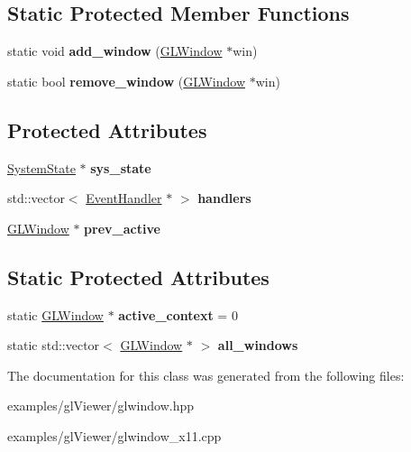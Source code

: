 \subsection*{Static Protected Member Functions}
\begin{DoxyCompactItemize}
\item 
\mbox{\label{classglwindow_1_1_g_l_window_a6ec4437b302fad937613bbc7305b54af}} 
static void {\bfseries add\+\_\+window} (\hyperlink{classglwindow_1_1_g_l_window}{G\+L\+Window} $\ast$win)
\item 
\mbox{\label{classglwindow_1_1_g_l_window_a20ba7d81fc374904b55ec40e3fb19a52}} 
static bool {\bfseries remove\+\_\+window} (\hyperlink{classglwindow_1_1_g_l_window}{G\+L\+Window} $\ast$win)
\end{DoxyCompactItemize}
\subsection*{Protected Attributes}
\begin{DoxyCompactItemize}
\item 
\mbox{\label{classglwindow_1_1_g_l_window_a362305bae97dad5418748841d7691694}} 
\hyperlink{struct_g_l_window_1_1_system_state}{System\+State} $\ast$ {\bfseries sys\+\_\+state}
\item 
\mbox{\label{classglwindow_1_1_g_l_window_a63eb370b84f35a788b4831e7e8ebb883}} 
std\+::vector$<$ \hyperlink{structglwindow_1_1_event_handler}{Event\+Handler} $\ast$ $>$ {\bfseries handlers}
\item 
\mbox{\label{classglwindow_1_1_g_l_window_a1b26b56139bda79015c4acd5082af29b}} 
\hyperlink{classglwindow_1_1_g_l_window}{G\+L\+Window} $\ast$ {\bfseries prev\+\_\+active}
\end{DoxyCompactItemize}
\subsection*{Static Protected Attributes}
\begin{DoxyCompactItemize}
\item 
\mbox{\label{classglwindow_1_1_g_l_window_ae9a8057a689a57a27f923bc745de4bf8}} 
static \hyperlink{classglwindow_1_1_g_l_window}{G\+L\+Window} $\ast$ {\bfseries active\+\_\+context} = 0
\item 
\mbox{\label{classglwindow_1_1_g_l_window_a53cc9ed919e7251c9a33bf5f9197375c}} 
static std\+::vector$<$ \hyperlink{classglwindow_1_1_g_l_window}{G\+L\+Window} $\ast$ $>$ {\bfseries all\+\_\+windows}
\end{DoxyCompactItemize}


The documentation for this class was generated from the following files\+:\begin{DoxyCompactItemize}
\item 
examples/gl\+Viewer/glwindow.\+hpp\item 
examples/gl\+Viewer/glwindow\+\_\+x11.\+cpp\end{DoxyCompactItemize}
